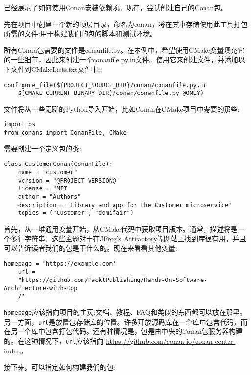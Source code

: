 
已经展示了如何使用Conan安装依赖项。现在，尝试创建自己的Conan包。

先在项目中创建一个新的顶层目录，命名为conan，将在其中存储使用此工具打包所需的文件:用于构建我们的包的脚本和测试环境。


所有Conan包需要的文件是conanfile.py。在本例中，希望使用CMake变量填充它的一些细节，因此来创建一个conanfile.py.in文件。使用它来创建文件，并添加以下文件到CMakeLists.txt文件中:

\begin{lstlisting}[style=styleCMake]
configure_file(${PROJECT_SOURCE_DIR}/conan/conanfile.py.in
	${CMAKE_CURRENT_BINARY_DIR}/conan/conanfile.py @ONLY)
\end{lstlisting}

文件将从一些无聊的Python导入开始，比如Conan在CMake项目中需要的那些:

\begin{lstlisting}[style=stylePython]
import os
from conans import ConanFile, CMake
\end{lstlisting}

需要创建一个定义包的类:

\begin{lstlisting}[style=stylePython]
class CustomerConan(ConanFile):
	name = "customer"
	version = "@PROJECT_VERSION@"
	license = "MIT"
	author = "Authors"
	description = "Library and app for the Customer microservice"
	topics = ("Customer", "domifair")
\end{lstlisting}

首先，从一堆通用变量开始，从CMake代码中获取项目版本。通常，描述将是一个多行字符串。这些主题对于在JFrog’s Artifactory等网站上找到库很有用，并且可以告诉读者我们的包是干什么的。现在来看看其他变量:

\begin{lstlisting}[style=stylePython]
	homepage = "https://example.com"
	url =
	"https://github.com/PacktPublishing/Hands-On-Software-Architecture-with-Cpp
	/"
\end{lstlisting}

\texttt{homepage}应该指向项目的主页:文档、教程、FAQ和类似的东西都可以放在那里。另一方面，\texttt{url}是放置包存储库的位置。许多开放源码库在一个库中包含代码，而在另一个库中包含打包代码。还有种情况是，包是由中央的Conan包服务器构建的。在这种情况下，\texttt{url}应该指向 \url{https://github.com/conan-io/conan-center-index}。

接下来，可以指定如何构建我们的包:

